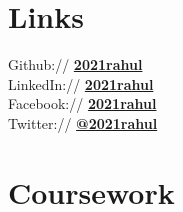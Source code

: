 \documentclass[]{resume}
\begin{document}
\begin{minipage}[t]{0.33\textwidth}

\section{Links} 
Github:// \href{https://github.com/2021rahul}{\bf 2021rahul} \\
LinkedIn://  \href{https://www.linkedin.com/in/2021rahul}{\bf 2021rahul} \\
Facebook:// \href{https://www.facebook.com/2021rahul}{\bf 2021rahul} \\
Twitter://  \href{https://twitter.com/2021rahul}{\bf @2021rahul} \\


\section{Coursework}


\end{minipage}
\end{document}
